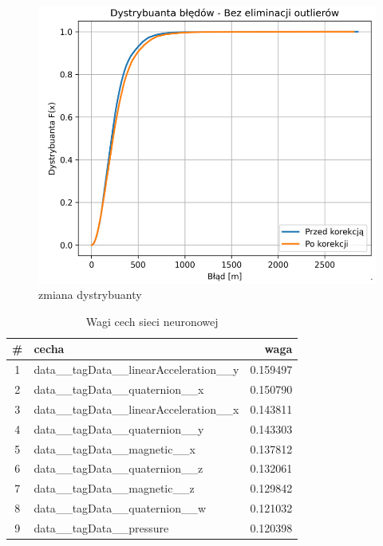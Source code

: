 \documentclass{classrep}
\begin{document}
{\begin{figure}[h!]
  \end{figure}
  \begin{figure}[h!]
	  \centering
	  \includegraphics[scale=0.40]{dystrb.png}
	  \caption{zmiana dystrybuanty}
	  \label{fig:dystrybuanta}
  \end{figure}
  \begin{table}[ht]
	  \centering
	  \caption{Wagi cech sieci neuronowej}
	  \begin{tabular}{|c|l|r|}
		  \hline
		  \textbf{\#} & \textbf{cecha}                             & \textbf{waga} \\
		  \hline
		  1           & data\_\_tagData\_\_linearAcceleration\_\_y & 0.159497      \\
		  2           & data\_\_tagData\_\_quaternion\_\_x         & 0.150790      \\
		  3           & data\_\_tagData\_\_linearAcceleration\_\_x & 0.143811      \\
		  4           & data\_\_tagData\_\_quaternion\_\_y         & 0.143303      \\
		  5           & data\_\_tagData\_\_magnetic\_\_x           & 0.137812      \\
		  6           & data\_\_tagData\_\_quaternion\_\_z         & 0.132061      \\
		  7           & data\_\_tagData\_\_magnetic\_\_z           & 0.129842      \\
		  8           & data\_\_tagData\_\_quaternion\_\_w         & 0.121032      \\
		  9           & data\_\_tagData\_\_pressure                & 0.120398      \\

\end{tabular}
\end{table}}
\end{document}
